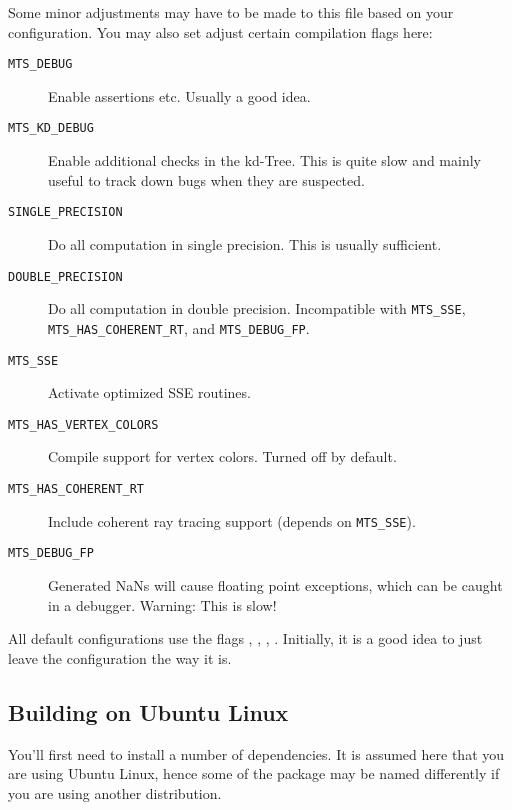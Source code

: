 Some minor adjustments may have to be made to this file based on your configuration. 
You may also set adjust certain compilation flags here:
\begin{description}
\item[\texttt{MTS\_DEBUG}] Enable assertions etc. Usually a good idea.
\item[\texttt{MTS\_KD\_DEBUG}] Enable additional checks in the kd-Tree. This
is quite slow and mainly useful to track down bugs when they are suspected.
\item[\texttt{SINGLE\_PRECISION}] Do all computation in single precision. This is usually sufficient.
\item[\texttt{DOUBLE\_PRECISION}] Do all computation in double precision. Incompatible with
\texttt{MTS\_SSE}, \texttt{MTS\_HAS\_COHERENT\_RT}, and \texttt{MTS\_DEBUG\_FP}.
\item[\texttt{MTS\_SSE}]Activate optimized SSE routines.
\item[\texttt{MTS\_HAS\_VERTEX\_COLORS}]Compile support for vertex colors. Turned off by
default.
\item[\texttt{MTS\_HAS\_COHERENT\_RT}]Include coherent ray tracing support (depends on \texttt{MTS\_SSE}).
\item[\texttt{MTS\_DEBUG\_FP}]Generated NaNs will cause floating point exceptions, which can be caught in a debugger. Warning: This is slow!
\end{description}
All default configurations use the flags , , , .
Initially, it is a good idea to just leave the configuration the way it is.

\subsection{Building on Ubuntu Linux}
You'll first need to install a number of dependencies. It is assumed here
that you are using Ubuntu Linux, hence some of the package may be named differently if you are 
using another distribution.

